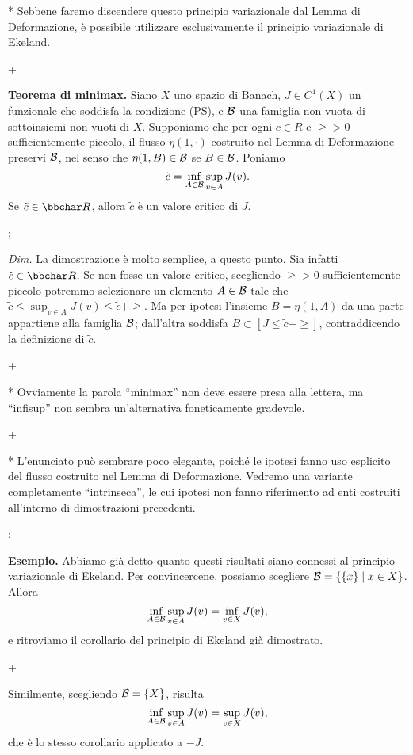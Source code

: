 * Sebbene faremo discendere questo principio variazionale dal Lemma di Deformazione, \`e possibile utilizzare esclusivamente il principio variazionale di Ekeland.

\pg+

{\bf Teorema di minimax.} Siano $X$ uno spazio di Banach, $J \in C^1(X)$ un funzionale che soddisfa la condizione (PS), e ${\cal B}$ una famiglia non vuota di sottoinsiemi non vuoti di $X$. Supponiamo che per ogni $c \in R$ e $\ge>0$ sufficientemente piccolo, il flusso $\eta(1,\cdot)$ costruito nel Lemma di Deformazione preservi ${\cal B}$, nel senso che $\eta(1,B) \in {\cal B}$ se $B \in {\cal B}$. Poniamo
$$
\tilde{c} = \inf_{A \in {\cal B}} \sup_{v \in A} J(v).
$$
Se $\tilde{c} \in \R$, allora $\tilde{c}$ \`e un valore critico di $J$.

\pg;

{\em Dim.} La dimostrazione \`e molto semplice, a questo punto. Sia infatti $\tilde{c} \in \R$. Se non fosse un valore critico, scegliendo $\ge>0$ sufficientemente piccolo potremmo selezionare un elemento $A \in {\cal B}$ tale che $\tilde{c} \leq \sup_{v \in A} J(v) \leq \tilde{c}+\ge$. Ma per ipotesi l'insieme $B = \eta(1,A)$ da una parte appartiene alla famiglia ${\cal B}$; dall'altra soddisfa $B \subset [J \leq \tilde{c}-\ge]$, contraddicendo la definizione di $\tilde{c}$.

\pg+

* Ovviamente la parola ``minimax'' non deve essere presa alla lettera, ma ``infisup'' non sembra un'alternativa foneticamente gradevole.

\pg+

* L'enunciato pu\`o sembrare poco elegante, poich\'e le ipotesi fanno uso esplicito del flusso costruito nel Lemma di Deformazione. Vedremo una variante completamente ``intrinseca'', le cui ipotesi non fanno riferimento ad enti costruiti all'interno di dimostrazioni precedenti.

\pg;

{\bf Esempio.} Abbiamo gi\`a detto quanto questi risultati siano connessi al principio variazionale di Ekeland. Per convincercene, possiamo scegliere ${\cal B} = \{\{x\}\mid x \in X\}$. Allora
$$\inf_{A\in{\cal B}} \sup_{v \in A} J(v) = \inf_{v \in X} J(v),$$
e ritroviamo il corollario del principio di Ekeland gi\`a dimostrato.

\pg+

Similmente, scegliendo ${\cal B} = \{X\}$, risulta
$$
\inf_{A \in {\cal B}} \sup_{v \in A} J(v) = \sup_{v \in X} J(v),
$$
che \`e lo stesso corollario applicato a $-J$.

